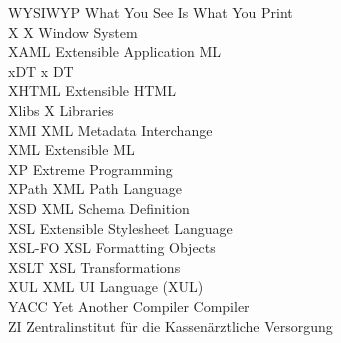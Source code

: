 \begin{tabbing}
    \>WYSIWYP \>\>What You See Is What You Print\\

    \>X \>\>X Window System\\

    \>XAML \>\>Extensible Application ML\\

    \>xDT \>\>x DT\\

    \>XHTML \>\>Extensible HTML\\

    \>Xlibs \>\>X Libraries\\

    \>XMI \>\>XML Metadata Interchange\\

    \>XML \>\>Extensible ML\\


    \>XP \>\>Extreme Programming\\

    \>XPath \>\>XML Path Language\\

    \>XSD \>\>XML Schema Definition\\

    \>XSL \>\>Extensible Stylesheet Language\\

    \>XSL-FO \>\>XSL Formatting Objects\\

    \>XSLT \>\>XSL Transformations\\

    \>XUL \>\>XML UI Language (XUL)\\

    \>YACC \>\>Yet Another Compiler Compiler\\


    \>ZI \>\>Zentralinstitut f\"{u}r die Kassen\"{a}rztliche Versorgung\\
\end{tabbing}
